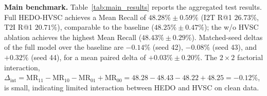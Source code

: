 \documentclass[runningheads,a4paper]{llncs}
\begin{document}
\begin{table}[t]
\centering
\caption{Retrieval results on the Flickr8k test split (1,000 images, 5,000 captions), mean $\pm$ standard deviation over 3 seeds. H: HEDO, V: HVSC.}
\label{tab:main_results}
\scriptsize
\setlength{\tabcolsep}{2pt}
\end{table}

\textbf{Main benchmark.} Table~\ref{tab:main_results} reports the aggregated test results. Full HEDO-HVSC achieves a Mean Recall of $48.28\% \pm 0.59\%$ (I2T R@1 $26.73\%$, T2I R@1 $20.71\%$), comparable to the baseline ($48.25\% \pm 0.47\%$); the w/o HVSC ablation achieves the highest Mean Recall ($48.43\% \pm 0.29\%$). Matched-seed deltas of the full model over the baseline are $-0.14\%$ (seed 42), $-0.08\%$ (seed 43), and $+0.32\%$ (seed 44), for a mean paired delta of $+0.03\% \pm 0.20\%$. The $2 \times 2$ factorial interaction, $\Delta_{\text{int}} = \text{MR}_{11} - \text{MR}_{10} - \text{MR}_{01} + \text{MR}_{00} = 48.28 - 48.43 - 48.22 + 48.25 = -0.12\%$, is small, indicating limited interaction between HEDO and HVSC on clean data.
\end{document}
